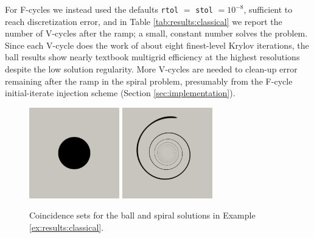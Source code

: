 \documentclass[review,hidelinks,onefignum,onetabnum]{siamart220329}
\begin{document}
\begin{example}
For F-cycles we instead used the defaults \texttt{rtol} $=$ \texttt{stol} $= 10^{-8}$, sufficient to reach discretization error, and in Table \ref{tab:results:classical} we report the number of V-cycles after the ramp; a small, constant number solves the problem.  Since each V-cycle does the work of about eight finest-level Krylov iterations, the ball results show nearly textbook multigrid efficiency at the highest resolutions despite the low solution regularity.  More V-cycles are needed to clean-up error remaining after the ramp in the spiral problem, presumably from the F-cycle initial-iterate injection scheme (Section \ref{sec:implementation}).
\end{example}

\begin{figure}[ht]
\centering
\includegraphics[width=0.35\textwidth]{fixfigs/ball-set.png} \qquad \includegraphics[width=0.35\textwidth]{fixfigs/spiral-set.png}
\caption{Coincidence sets for the ball and spiral solutions in Example \ref{ex:results:classical}.}
\label{fig:results:classical}
\end{figure}
\end{document}
